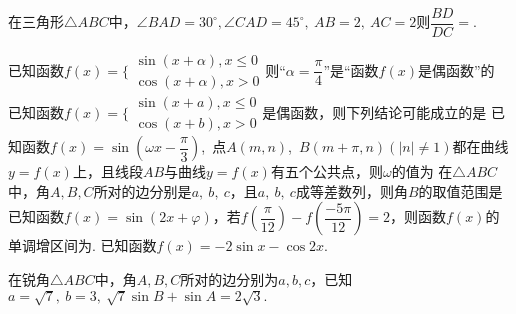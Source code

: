 \documentclass[marginline,noindent,answers,adobefonts]{BHCexam}
\begin{document}
\begin{questions}
\qs 在三角形$\triangle ABC$中，$ \angle BAD=30^{\circ},\angle CAD=45^{\circ},~AB=2,~AC=2 $则$ \dfrac{BD}{DC}= $\tk.
\vspace{-2em}
\begin{center}
\end{center} 
\qs 已知函数$f(x)=\Bigg\{\begin{aligned}
\sin(x+\alpha),x\le 0\\\cos (x+\alpha),x>0
\end{aligned}$则“$ \alpha=\dfrac{\pi}{4} $”是“函数$f(x)$是偶函数”的\xx
{}
\qs 已知函数$f(x)=\Bigg\{\begin{aligned}
\sin(x+a),x\le 0\\\cos (x+b),x>0
\end{aligned}$是偶函数，则下列结论可能成立的是\xx
{}
\qs 已知函数$f(x)=\sin (\omega x-\dfrac{\pi}{3})$,~点$ A(m,n) $,~$ B(m+\pi,n) (\left|n\right|\ne 1)$都在曲线$ y=f(x) $上，且线段$ AB $与曲线$ y=f(x) $有五个公共点，则$ \omega $的值为\xx
{}
\qs 在$\triangle ABC$中，角$ A,B,C $所对的边分别是$ a,\ b,\ c $，且$ a,\ b,\ c $成等差数列，则角$ B $的取值范围是\xx
\onech{$ \left(0,\dfrac{\pi}{3}\right]$}{$ \left(\dfrac{\pi}{6},\dfrac{\pi}{2}\right)$}{$ \left(\dfrac{\pi}{4},\dfrac{\pi}{2}\right)$}{$ \left(\dfrac{\pi}{3},\dfrac{\pi}{2}\right)$}
\qs 已知函数$f(x)=\sin (2x+\varphi)$，若$ f(\dfrac{\pi}{12})-f(\dfrac{-5\pi}{12})=2 $，则函数$f(x)$的单调增区间为\tk.
\newpage
\qs 已知函数$f(x)=-2\sin x-\cos 2x$.
\kongbai
\qs 在锐角$\triangle ABC$中，角$ A,B,C $所对的边分别为$ a,b,c $，已知$ a=\sqrt{7},~b=3,~\sqrt{7}\sin B+\sin A=2\sqrt{3}.$
\begin{parts}

\end{parts}
\end{questions}
\end{document}
